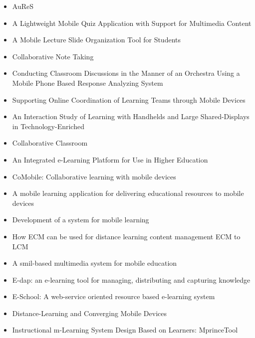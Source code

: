 \vspace{-5mm}
\begin{itemize}
    \item AuReS \cite{jagar_auress:_2012}
    \item A Lightweight Mobile Quiz Application with Support for Multimedia Content \cite{schon_lightweight_2012}
    \item A Mobile Lecture Slide Organization Tool for Students \cite{chow_mobile_2006}
    \item Collaborative Note Taking \cite{singh_collaborative_2004}
    \item Conducting Classroom Discussions in the Manner of an Orchestra Using a Mobile Phone Based Response Analyzing System \cite{nakai_conducting_2007}
    \item Supporting Online Coordination of Learning Teams through Mobile Devices \cite{roig-torres_supporting_2012}
    \item An Interaction Study of Learning with Handhelds and Large Shared-Displays in Technology-Enriched \item Collaborative Classroom \cite{liu_interaction_2007}
    \item An Integrated e-Learning Platform for Use in Higher Education \cite{florea_integrated_2011}
    \item CoMobile: Collaborative learning with mobile devices \cite{nguyen_comobile:_2006}
    \item A mobile learning application for delivering educational resources to mobile devices \cite{boyinbode_mobile_2012}
    \item Development of a system for mobile learning \cite{covic_development_2010}
    \item How ECM can be used for distance learning content management ECM to LCM \cite{daoudi_how_2012}
    \item A smil-based multimedia system for mobile education \cite{di_smil-based_2009}
    \item E-dap: an e-learning tool for managing, distributing and capturing knowledge \cite{bonastre_e-dap:_2005}
    \item E-School: A web-service oriented resource based e-learning system \cite{sultana_e-school:_2010}
    \item Distance-Learning and Converging Mobile Devices \cite{hoganson_distance-learning_2009}
    \item Instructional m-Learning System Design Based on Learners: MprinceTool \cite{fardoun_instructional_2010}

\end{itemize}
